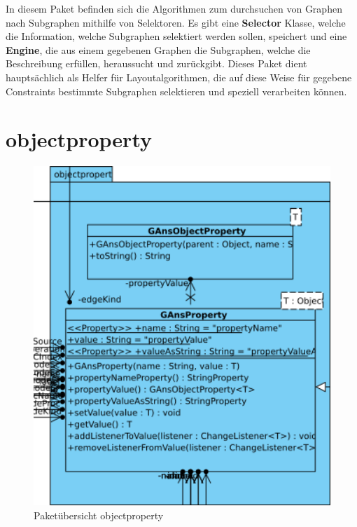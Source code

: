 In diesem Paket befinden sich die Algorithmen zum durchsuchen von Graphen nach Subgraphen mithilfe von Selektoren. Es gibt eine \textbf{Selector} Klasse, welche die Information, welche Subgraphen selektiert werden sollen, speichert und eine \textbf{Engine}, die aus einem gegebenen Graphen die Subgraphen, welche die Beschreibung erfüllen, heraussucht und zurückgibt. Dieses Paket dient hauptsächlich als Helfer für Layoutalgorithmen, die auf diese Weise für gegebene Constraints bestimmte Subgraphen selektieren und speziell verarbeiten können.

\newpage

\section{objectproperty}
\label{sec:objectproperty}
\begin{figure}[hb]
  \centering
  \includegraphics[width=380pt]{resourcen/objectproperty.png}
  \caption{Paketübersicht objectproperty}
  \label{fig:packge_objectproperty}
\end{figure}

